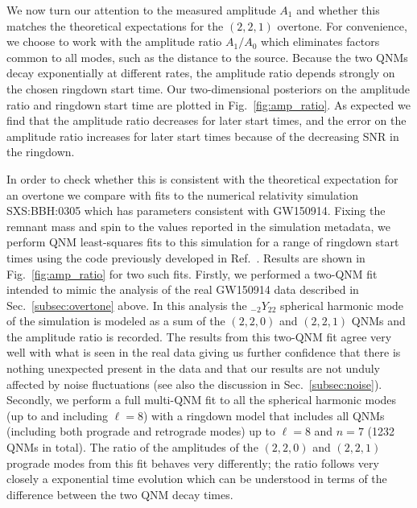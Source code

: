 We now turn our attention to the measured amplitude $A_1$ and whether this matches the theoretical expectations for the $(2,2,1)$ overtone. 
For convenience, we choose to work with the amplitude ratio $A_1/A_0$ which eliminates factors common to all modes, such as the distance to the source. 
Because the two QNMs decay exponentially at different rates, the amplitude ratio depends strongly on the chosen ringdown start time.
Our two-dimensional posteriors on the amplitude ratio and ringdown start time are plotted in Fig.~\ref{fig:amp_ratio}.
As expected we find that the amplitude ratio decreases for later start times, and the error on the amplitude ratio increases for later start times because of the decreasing SNR in the ringdown.

In order to check whether this is consistent with the theoretical expectation for an overtone we compare with fits to the numerical relativity simulation SXS:BBH:0305 \cite{2016CQGra..33x4002L, sxs_catalog} which has parameters consistent with GW150914.
Fixing the remnant mass and spin to the values reported in the simulation metadata, we perform QNM least-squares fits to this simulation for a range of ringdown start times using the code previously developed in Ref.~\cite{Finch:2021iip}.
Results are shown in Fig.~\ref{fig:amp_ratio} for two such fits. 
Firstly, we performed a two-QNM fit intended to mimic the analysis of the real GW150914 data described in Sec.~\ref{subsec:overtone} above. 
In this analysis the ${}_{-2}Y_{22}$ spherical harmonic mode of the simulation is modeled as a sum of the $(2,2,0)$ and $(2,2,1)$ QNMs and the amplitude ratio is recorded. 
The results from this two-QNM fit agree very well with what is seen in the real data giving us further confidence that there is nothing unexpected present in the data and that our results are not unduly affected by noise fluctuations (see also the discussion in Sec.~\ref{subsec:noise}). 
Secondly, we perform a full multi-QNM fit to all the spherical harmonic modes (up to and including $\ell = 8$) with a ringdown model that includes all QNMs (including both prograde and retrograde modes) up to $\ell = 8$ and $n = 7$ (1232 QNMs in total).
The ratio of the amplitudes of the $(2,2,0)$ and $(2,2,1)$ prograde modes from this fit behaves very differently; the ratio follows very closely a exponential time evolution which can be understood in terms of the difference between the two QNM decay times.

